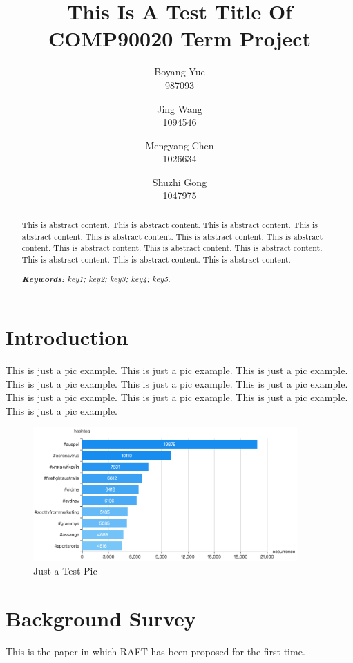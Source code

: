 \documentclass[12pt, a4paper]{article}
\title{This Is A Test Title Of COMP90020 Term Project}
\author{Boyang Yue \\987093 \and Jing Wang \\1094546 \and Mengyang Chen \\1026634 \and Shuzhi Gong \\1047975 }
\date{}
\begin{document}
\maketitle

\begin{abstract}

This is abstract content. This is abstract content. This is abstract content. This is abstract content. This is abstract content. This is abstract content. This is abstract content. This is abstract content. This is abstract content. This is abstract content. This is abstract content. This is abstract content. This is abstract content. 

\noindent
\textit{\textbf{Keywords: } key1; key2; key3; key4; key5.}

\end{abstract}


\section{Introduction}

This is just a pic example. This is just a pic example. This is just a pic example. This is just a pic example. This is just a pic example. This is just a pic example. This is just a pic example. This is just a pic example. This is just a pic example. This is just a pic example. 

\begin{figure}[h!]
\centering
\includegraphics[width = 0.9\textwidth]{1.png}
\caption{Just a Test Pic}
\label{test}
\end{figure}


\section{Background Survey}

This is the paper in which RAFT has been proposed for the first time\cite{ongaro2014search}.
\end{document}
